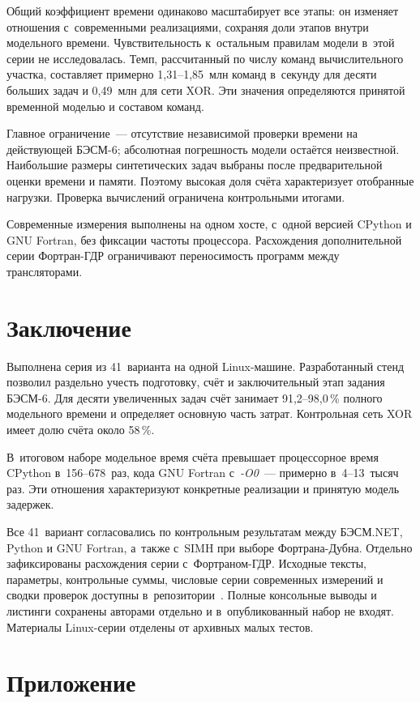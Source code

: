 \documentclass[a4paper,12pt]{article}
\begin{document}
Общий коэффициент времени одинаково масштабирует все этапы: он изменяет отношения с~современными реализациями, сохраняя доли этапов внутри модельного времени. Чувствительность к~остальным правилам модели в~этой серии не исследовалась. Темп, рассчитанный по числу команд вычислительного участка, составляет примерно 1,31--1,85~млн команд в~секунду для десяти больших задач и 0,49~млн для сети XOR. Эти значения определяются принятой временной моделью и составом команд.

Главное ограничение~--- отсутствие независимой проверки времени на действующей БЭСМ-6; абсолютная погрешность модели остаётся неизвестной. Наибольшие размеры синтетических задач выбраны после предварительной оценки времени и памяти. Поэтому высокая доля счёта характеризует отобранные нагрузки. Проверка вычислений ограничена контрольными итогами.

Современные измерения выполнены на одном хосте, с~одной версией CPython и GNU Fortran, без фиксации частоты процессора. Расхождения дополнительной серии Фортран-ГДР ограничивают переносимость программ между трансляторами.

\section{Заключение}

Выполнена серия из 41~варианта на одной Linux-машине. Разработанный стенд позволил раздельно учесть подготовку, счёт и заключительный этап задания БЭСМ-6. Для десяти увеличенных задач счёт занимает 91,2--98,0\,\% полного модельного времени и определяет основную часть затрат. Контрольная сеть XOR имеет долю счёта около 58\,\%.

В~итоговом наборе модельное время счёта превышает процессорное время CPython в~156--678~раз, кода GNU Fortran с~\mbox{\textit{-O0}}~--- примерно в~4--13~тысяч раз. Эти отношения характеризуют конкретные реализации и принятую модель задержек.

Все 41~вариант согласовались по контрольным результатам между БЭСМ.NET, Python и GNU Fortran, а~также с~SIMH при выборе Фортрана-Дубна. Отдельно зафиксированы расхождения серии с~Фортраном-ГДР. Исходные тексты, параметры, контрольные суммы, числовые серии современных измерений и сводки проверок доступны в~репозитории~\cite{besm6net}. Полные консольные выводы и листинги сохранены авторами отдельно и в~опубликованный набор не входят. Материалы Linux-серии отделены от архивных малых тестов.

\section*{\protect\rmfamily Приложение}
\end{document}
